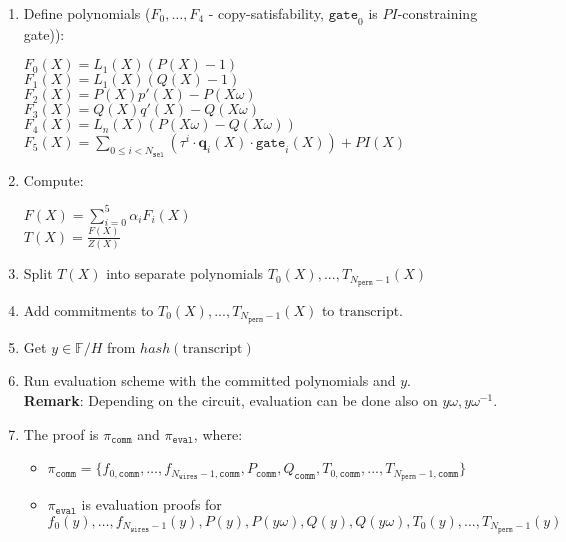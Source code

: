 \begin{enumerate}
    \item Define polynomials ($F_0, \dots, F_4$ - copy-satisfability, $\texttt{gate}_0$ is $PI$-constraining gate)):
    \begin{center}
        $F_0(X) = L_1(X)(P(X) - 1)$\\
        $F_1(X) = L_1(X)(Q(X) - 1)$ \\
        $F_2(X) = P(X)p'(X) - P(X\omega)$ \\
        $F_3(X) = Q(X)q'(X) - Q(X\omega)$ \\
        $F_4(X) = L_n(X)(P(X\omega) - Q(X\omega))$ \\
        $F_5(X) = \sum\limits_{0 \leq i < N_{\texttt{sel}}} (\tau^i \cdot \textbf{q}_{i}(X) \cdot \texttt{gate}_i(X))
        + PI(X)$
    \end{center}
    \item Compute:
    \begin{center}
        $F(X) = \sum\limits_{i = 0}^5 \alpha_iF_i(X)$ \\
        $T(X) = \frac{F(X)}{Z(X)}$
    \end{center}
    \item Split $T(X)$ into separate polynomials $T_0(X), ..., T_{N_{\texttt{perm}} - 1}(X)$
    \item Add commitments to $T_0(X), ..., T_{N_{\texttt{perm}} - 1}(X)$ to $\text{transcript}$.
    \item Get $y \in \mathbb{F}/H$ from $hash(\text{transcript})$
    \item Run evaluation scheme with the committed polynomials and $y$. \\
    \textbf{Remark}: Depending on the circuit, evaluation can be done also on $y\omega, y\omega^{-1}$.
    \item The proof is $\pi_{\texttt{comm}}$ and $\pi_{\texttt{eval}}$, where:
    \begin{itemize}
        \item $\pi_{\texttt{comm}} = \{f_{0, \texttt{comm}}, \dots, f_{N_{\texttt{wires}} - 1, \texttt{comm}},
        P_{\texttt{comm}}, Q_{\texttt{comm}}, T_{0, \texttt{comm}}, ..., T_{N_{\texttt{perm}} - 1, \texttt{comm}} \}$
        \item  $\pi_{\texttt{eval}}$ is evaluation proofs for $f_0(y), \dots, f_{N_{\texttt{wires}} - 1}(y), P(y), P(y\omega), Q(y), Q(y\omega), T_0(y), \dots, T_{N_{\texttt{perm}} - 1}(y)$
    \end{itemize}
\end{enumerate}

